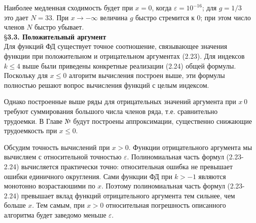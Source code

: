 Наиболее медленная сходимость будет при $x = 0$, когда $\varepsilon = 10^{-16}$; для
$g = 1/3$ это дает $N = 33$. При $x \to -\infty$ величина $g$ быстро стремится к $0$; при
этом число членов $N$ быстро убывает.
\\

\S \textbf{3.3. Положительный аргумент}
\\

Для функций ФД существует точное соотношение, связывающее значения функции при положительном и
отрицательном аргументах (2.23). Для индексов $k \leqslant 4$ выше были приведены конкретные реализации (2.24) общей формулы. Поскольку для $x \leqslant 0$ алгоритм вычисления построен выше, эти формулы полностью решают вопрос вычисления функций с целым индексом.

Однако построенные выше ряды для отрицательных значений аргумента при $x~0$ требуют суммирования большого числа членов ряда, т.е. сравнительно трудоемки. В Главе № будут построены аппроксимации, существенно снижающие трудоемкость при $x \leqslant 0$.

Обсудим точность вычислений при $x > 0$. Функции отрицательного аргумента мы вычисляем с относительной точностью $\varepsilon$. Полиномиальная часть формул (2.23-2.24) вычисляется практически точно: относительная ошибка не превышает ошибки единичного округления. Сами функции ФД при $k > -1$ являются монотонно возрастаюшими по $x$. Поэтому полиномиальная часть формул (2.23-2.24) превышает вклад функций отрицательного аргумента тем сильнее, чем больше $x$. Тем самым, при $x>0$ относительная погрешность описанного алгоритма будет заведомо меньше $\varepsilon$.
